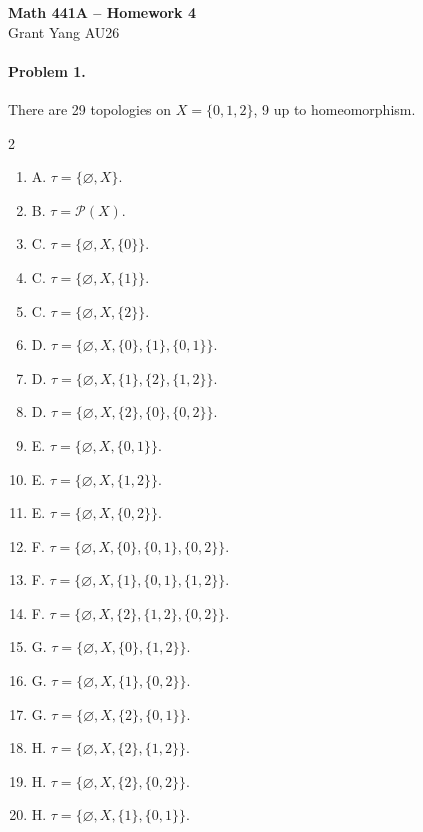 \documentclass[12pt]{article}
\begin{document}
\begin{center} {\large \textbf{Math 441A -- Homework 4}} \smallskip \\ 
    Grant Yang \hspace{1em} AU26
 \end{center}

\paragraph{Problem 1.} There are 29 topologies on $X = \{0, 1, 2\}$, 9 up to homeomorphism.
\begin{multicols}{2}
\begin{enumerate}
    \item A. $\tau = \{\varnothing, X\}$.
    \item B. $\tau = \mathcal{P}(X)$.
    \item C. $\tau = \{\varnothing, X, \{0\}\}$.
    \item C. $\tau = \{\varnothing, X, \{1\}\}$.
    \item C. $\tau = \{\varnothing, X, \{2\}\}$.
    \item D. $\tau = \{\varnothing, X, \{0\}, \{1\}, \{0, 1\}\}$.
    \item D. $\tau = \{\varnothing, X, \{1\}, \{2\}, \{1,2\}\}$.
    \item D. $\tau = \{\varnothing, X, \{2\}, \{0\}, \{0, 2\}\}$.
    \item E. $\tau = \{\varnothing, X, \{0, 1\}\}$.
    \item E. $\tau = \{\varnothing, X, \{1, 2\}\}$.
    \item E. $\tau = \{\varnothing, X, \{0, 2\}\}$.
    \item F. $\tau = \{\varnothing, X, \{0\}, \{0, 1\}, \{0, 2\}\}$.
    \item F. $\tau = \{\varnothing, X, \{1\}, \{0, 1\}, \{1, 2\}\}$.
    \item F. $\tau = \{\varnothing, X, \{2\}, \{1, 2\}, \{0, 2\}\}$.
    \item G. $\tau = \{\varnothing, X, \{0\}, \{1, 2\}\}$.
    \item G. $\tau = \{\varnothing, X, \{1\}, \{0, 2\}\}$.
    \item G. $\tau = \{\varnothing, X, \{2\}, \{0, 1\}\}$.
    \item H. $\tau = \{\varnothing, X, \{2\}, \{1, 2\}\}$.
    \item H. $\tau = \{\varnothing, X, \{2\}, \{0, 2\}\}$.
    \item H. $\tau = \{\varnothing, X, \{1\}, \{0, 1\}\}$.


\end{enumerate}
\end{multicols}
\end{document}
